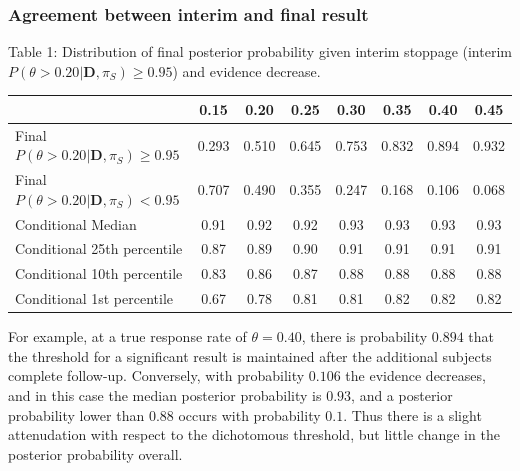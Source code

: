 \documentclass[12pt]{article}
\begin{document}
\subsubsection{Agreement between interim and final result}
\begin{center}
Table 1: Distribution of final posterior probability given interim stoppage (interim $P(\theta>0.20|\mathbf{D},\pi_S)\geq 0.95$) and evidence decrease.
\begin{tabular}{l|ccccccc}
&0.15&0.20&0.25&0.30&0.35&0.40&0.45\\
\hline
Final $P(\theta>0.20|\mathbf{D},\pi_S)\geq 0.95$ &0.293&0.510&0.645&0.753&0.832&0.894&0.932 \\ 
Final $P(\theta>0.20|\mathbf{D},\pi_S)< 0.95$&0.707&0.490&0.355&0.247&0.168&0.106&0.068\\  
\hspace{0.5in}Conditional Median&0.91&0.92&0.92&0.93&0.93&0.93&0.93\\  
\hspace{0.5in}Conditional 25th percentile&0.87&0.89&0.90&0.91&0.91&0.91&0.91\\  
\hspace{0.5in}Conditional 10th percentile&0.83&0.86&0.87&0.88&0.88&0.88&0.88\\  
\hspace{0.5in}Conditional 1st percentile&0.67&0.78&0.81&0.81&0.82&0.82&0.82
\end{tabular}
\end{center}

For example, at a true response rate of $\theta=0.40$, there is probability $0.894$ that the threshold for a significant result is maintained after the additional subjects complete follow-up. Conversely, with probability $0.106$ the evidence decreases, and in this case the median posterior probability is $0.93$, and a posterior probability lower than $0.88$ occurs with probability $0.1$. Thus there is a slight attenudation with respect to the dichotomous threshold, but little change in the posterior probability overall.

\newpage
\end{document}
